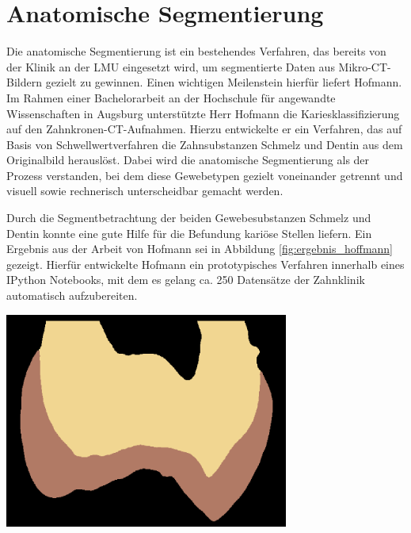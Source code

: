 \chapter{Anatomische Segmentierung}
\label{chap:theoretische_grundlagen} Die anatomische Segmentierung ist ein bestehendes
Verfahren, das bereits von der Klinik an der LMU eingesetzt wird, um segmentierte
Daten aus Mikro-\ac{CT}-Bildern gezielt zu gewinnen. Einen wichtigen Meilenstein
hierfür liefert Hofmann. Im Rahmen einer Bachelorarbeit an der Hochschule für
angewandte Wissenschaften in Augsburg unterstützte Herr Hofmann die
Kariesklassifizierung auf den Zahnkronen-\ac{CT}-Aufnahmen. Hierzu entwickelte
er ein Verfahren, das auf Basis von Schwellwertverfahren die Zahnsubstanzen Schmelz
und Dentin aus dem Originalbild herauslöst. Dabei wird die anatomische
Segmentierung als der Prozess verstanden, bei dem diese Gewebetypen gezielt voneinander
getrennt und visuell sowie rechnerisch unterscheidbar gemacht werden.

\begin{minipage}{0.40\textwidth}
	Durch die Segmentbetrachtung der beiden Gewebesubstanzen Schmelz und Dentin konnte
	\citet[S.~41]{hoffmann2020} eine gute Hilfe für die Befundung kariöse Stellen
	liefern. Ein Ergebnis aus der Arbeit von Hofmann sei in Abbildung \ref{fig:ergebnis_hoffmann}
	gezeigt. Hierfür entwickelte Hofmann ein prototypisches Verfahren innerhalb
	eines IPython Notebooks, mit dem es gelang ca. 250 Datensätze der Zahnklinik
	automatisch aufzubereiten.
\end{minipage}
\hfill
\begin{minipage}{0.50\textwidth}
	\centering
	\includegraphics[width=0.7\textwidth]{img/ergebnis_hoffmann_2.jpg}
	 \label{fig:ergebnis_hoffmann}
\end{minipage}

